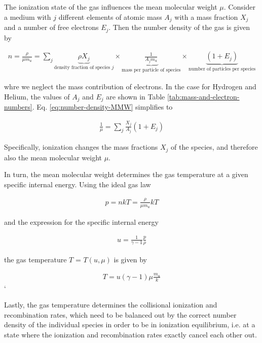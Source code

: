 The ionization state of the gas influences the mean molecular weight $\mu$. Consider a medium with 
$j$ different elements of atomic mass $A_j$ with a mass fraction $X_j$ and a number of free 
electrons $E_j$. Then the number density of the gas is given by

\begin{align}
    n = \frac{\rho}{\mu m_u} = 
        \sum_j \underbrace{\rho X_j}_{\text{density fraction of species } j} \times
        \underbrace{\frac{1}{A_j m_u}}_{\text{mass per particle of species}} \times
        \underbrace{(1 + E_j)}_{\text{number of particles per species}} 
\label{eq:number-density-MMW}
\end{align}


whre we neglect the mass contribution of electrons. In the case for Hydrogen and Helium, the values 
of $A_j$ and $E_j$ are shown in Table \ref{tab:mass-and-electron-numbers}. Eq. 
\ref{eq:number-density-MMW} simplifies to

\begin{align}
    \frac{1}{\mu} = \sum_j \frac{X_j}{A_j} (1 + E_j)
\end{align}

Specifically, ionization changes the mass fractions $X_j$ of the species, and therefore also the 
mean molecular weight $\mu$.

In turn, the mean molecular weight determines the gas temperature at a given specific internal 
energy. Using the ideal gas law

\begin{align}
    p = n k T = \frac{\rho}{\mu m_u} k T
\end{align}

and the expression for the specific internal energy

\begin{align}
    u = \frac{1}{\gamma - 1} \frac{p}{\rho}
\end{align}

the gas temperature $T$ = $T(u, \mu)$ is given by

\begin{align}
    T = u (\gamma - 1) \mu \frac{m_u}{k}
\end{align}`

Lastly, the gas temperature determines the collisional ionization and recombination rates, which 
need to be balanced out by the correct number density of the individual species in order to be in 
ionization equilibrium, i.e. at a state where the ionization and recombination rates exactly cancel 
each other out.

